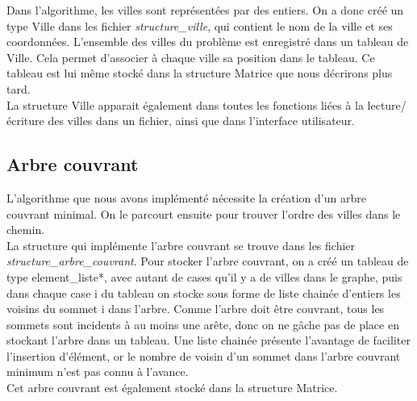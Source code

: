 \documentclass[a4paper,11pt]{article}
\begin{document}
Dans l'algorithme, les villes sont représentées par des entiers. On a donc créé un type \textsf{Ville} dans les fichier \emph{structure\_ville}, qui contient le nom de la ville et ses coordonnées. L'ensemble des villes du problème est enregistré dans un tableau de \textsf{Ville}. Cela permet d'associer à chaque ville sa position dans le tableau. Ce tableau est lui même stocké dans la structure \textsf{Matrice} que nous décrirons plus tard.\\
La structure Ville apparait également dans toutes les fonctions liées à la lecture/écriture des villes dans un fichier, ainsi que dans l'interface utilisateur.

\subsection{Arbre couvrant}

L'algorithme que nous avons implémenté nécessite la création d'un arbre couvrant minimal. On le parcourt ensuite pour trouver l'ordre des villes dans le chemin.\\
La structure qui implémente l'arbre couvrant se trouve dans les fichier \emph{structure\_arbre\_couvrant}. 
Pour stocker l'arbre couvrant, on a créé un tableau de type \textsf{element\_liste*}, avec autant de cases qu'il y a de villes dans le graphe, puis dans chaque case i du tableau on stocke sous forme de liste chainée d'entiers les voisins du sommet i dans l'arbre. Comme l'arbre doit être couvrant, tous les sommets sont incidents à au moins une arête, donc on ne gâche pas de place en stockant l'arbre dans un tableau. Une liste chainée présente l'avantage de faciliter l'insertion d'élément, or le nombre de voisin d'un sommet dans l'arbre couvrant minimum n'est pas connu à l'avance.\\
Cet arbre couvrant est également stocké dans la structure Matrice.
\end{document}
